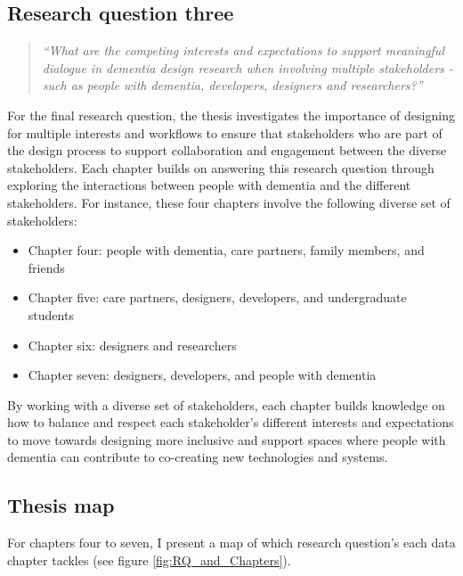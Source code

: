 \subsection{Research question three}
\label{RQ3}
\begin{quote}
\textit{``What are the competing interests and expectations to support meaningful dialogue in dementia design research when involving multiple stakeholders - such as people with dementia, developers, designers and researchers?''}
\end{quote}
For the final research question, the thesis investigates the importance of designing for multiple interests and workflows to ensure that stakeholders who are part of the design process to support collaboration and engagement between the diverse stakeholders. Each chapter builds on answering this research question through exploring the interactions between people with dementia and the different stakeholders. For instance, these four chapters involve the following diverse set of stakeholders:
\begin{itemize}
\item Chapter four: people with dementia, care partners, family members, and friends
\item Chapter five: care partners, designers, developers, and undergraduate students
\item Chapter six: designers and researchers
\item Chapter seven: designers, developers, and people with dementia
\end{itemize}

By working with a diverse set of stakeholders, each chapter builds knowledge on how to balance and respect each stakeholder's different interests and expectations to move towards designing more inclusive and support spaces where people with dementia can contribute to co-creating new technologies and systems.

\subsection{Thesis map}
For chapters four to seven, I present a map of which research question's each data chapter tackles (see figure \ref{fig:RQ_and_Chapters}).


